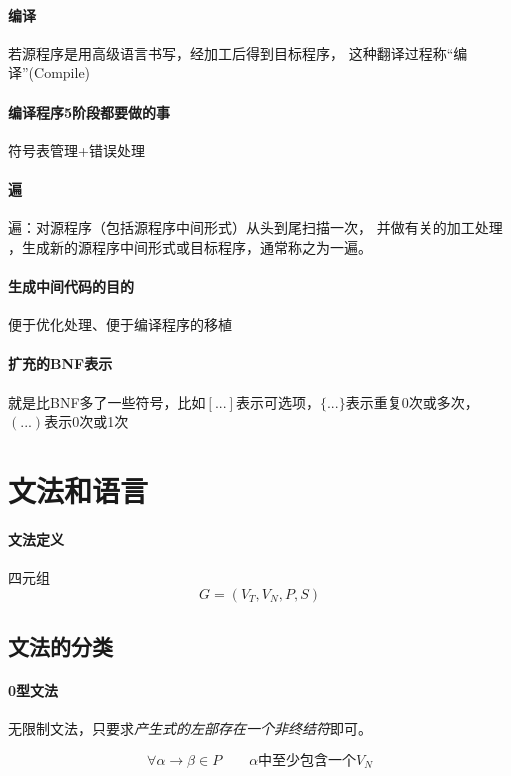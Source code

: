 \documentclass[UTF8]{ctexart} %
\begin{document}
\paragraph{编译} 若源程序是用高级语言书写，经加工后得到目标程序， 这种翻译过程称“编译”(Compile)

\paragraph{编译程序5阶段都要做的事} 符号表管理+错误处理

\paragraph{遍} 遍：对源程序（包括源程序中间形式）从头到尾扫描一次， 并做有关的加工处理 ，生成新的源程序中间形式或目标程序，通常称之为一遍。

\paragraph{生成中间代码的目的} 便于优化处理、便于编译程序的移植

\paragraph{扩充的BNF表示} 就是比BNF多了一些符号，比如$[...]$表示可选项，$\{...\}$表示重复0次或多次，$(...)$表示0次或1次

\section{文法和语言}

\paragraph{文法定义} 四元组
\begin{equation}
    G=(V_T,V_N,P,S)
\end{equation}
\subsection{文法的分类}

\paragraph{0型文法} 无限制文法，只要求\emph{产生式的左部存在一个非终结符}即可。

\begin{equation}
    \forall \alpha \rightarrow \beta \in P \qquad \alpha\text{中至少包含一个}V_N
\end{equation}
\end{document}
